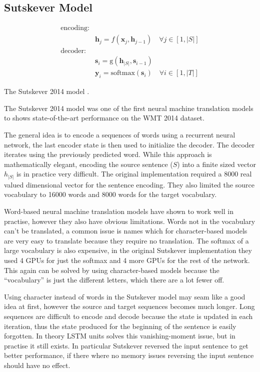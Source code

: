 \subsection{Sutskever Model}

\begin{equationbox}[H]
\begin{equation*}
\begin{aligned}
\text{encoding:} & \\
& \mathbf{h}_j = f(\mathbf{x}_j, \mathbf{h}_{j-1}) \quad \forall j \in [1, |S|] \\
\text{decoder:} & \\
&\mathbf{s}_i = \mathrm{g}(\mathbf{h}_{|S|}, \mathbf{s}_{i-1}) \\
&\mathbf{y}_i = \mathrm{softmax}(\mathbf{s}_i) \quad \forall i \in [1, |T|]
\end{aligned}
\end{equation*}
\caption{The Sutskever 2014 model \cite{sutskever-2014-nmt}.}
\end{equationbox}

The Sutskever 2014 model \cite{sutskever-2014-nmt} was one of the first neural machine translation models to shows state-of-the-art performance on the WMT 2014 dataset.

The general idea is to encode a sequences of words using a recurrent neural network, the last encoder state is then used to initialize the decoder. The decoder iterates using the previously predicted word. While this approach is mathematically elegant, encoding the source sentence ($S$) into a finite sized vector $h_{|S|}$ is in practice very difficult. The original implementation required a 8000 real valued dimensional vector for the sentence encoding. They also limited the source vocabulary to 16000 words and 8000 words for the target vocabulary.

Word-based neural machine translation models have shown to work well in practise, however they also have obvious limitations. Words not in the vocabulary can't be translated, a common issue is names which for character-based models are very easy to translate because they require no translation. The softmax of a large vocabulary is also expensive, in the original Sutskever implementation they used 4 GPUs for just the softmax and 4 more GPUs for the rest of the network. This again can be solved by using character-based models because the ``vocabulary'' is just the different letters, which there are a lot fewer off.

Using character instead of words in the Sutskever model may seam like a good idea at first, however the source and target sequences becomes much longer. Long sequences are difficult to encode and decode because the state is updated in each iteration, thus the state produced for the beginning of the sentence is easily forgotten. In theory LSTM units solves this vanishing-moment issue, but in practise it still exists. In particular Sutskever reversed the input sentence to get better performance, if there where no memory issues reversing the input sentence should have no effect.


